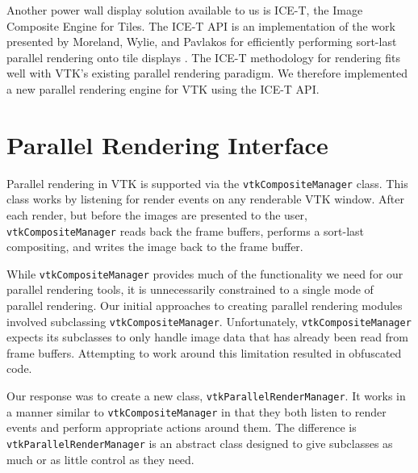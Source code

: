 \documentclass{acmsiggraph}
\newcommand{\cidentifier}[1]{\texttt{#1}}
\begin{document}
  Another power wall display solution available to us is ICE-T, the Image
  Composite Engine for Tiles.  The ICE-T API is an implementation of the
  work presented by Moreland, Wylie, and Pavlakos for efficiently
  performing sort-last parallel rendering onto tile displays
  \cite{Moreland01}.  The ICE-T methodology for rendering fits well with
  VTK's existing parallel rendering paradigm.  We therefore implemented a
  new parallel rendering engine for VTK using the ICE-T API.


  \section{Parallel Rendering Interface}
  \label{sec:parallel_rendering_interface}

  Parallel rendering in VTK is supported via the
  \cidentifier{vtk\-Composite\-Manager} class.  This class works by
  listening for render events on any renderable VTK window.  After each
  render, but before the images are presented to the user,
  \cidentifier{vtk\-Composite\-Manager} reads back the frame buffers,
  performs a sort-last compositing, and writes the image back to the frame
  buffer.

  While \cidentifier{vtk\-Composite\-Manager} provides much of the
  functionality we need for our parallel rendering tools, it is
  unnecessarily constrained to a single mode of parallel rendering.  Our
  initial approaches to creating parallel rendering modules involved
  subclassing \cidentifier{vtk\-Composite\-Manager}.  Unfortunately,
  \cidentifier{vtk\-Composite\-Manager} expects its subclasses to only
  handle image data that has already been read from frame buffers.
  Attempting to work around this limitation resulted in obfuscated code.

  Our response was to create a new class,
  \cidentifier{vtk\-Parallel\-Render\-Manager}.  It works in a manner
  similar to \cidentifier{vtk\-Composite\-Manager} in that they both listen
  to render events and perform appropriate actions around them.  The
  difference is \cidentifier{vtk\-Parallel\-Render\-Manager} is an abstract
  class designed to give subclasses as much or as little control as they
  need.
\end{document}
